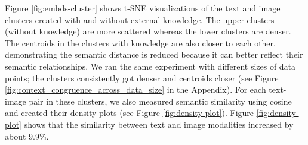 Figure \ref{fig:embds-cluster} shows t-SNE visualizations of the text and image clusters created with and without external knowledge. The upper clusters (without knowledge) are more scattered whereas the lower clusters are denser. The centroids in the clusters with knowledge are also closer to each other, demonstrating the semantic distance is reduced because it can better reflect their semantic relationships. We ran the same experiment with different sizes of data points; 
the clusters consistently got denser and centroids closer (see Figure \ref{fig:context_congruence_across_data_size} in the Appendix).
For each text-image pair in these clusters, we also measured semantic similarity using cosine and created their density plots (see Figure \ref{fig:density-plot}). 
Figure \ref{fig:density-plot} shows
that the similarity between text and image modalities increased by about 9.9\%.



